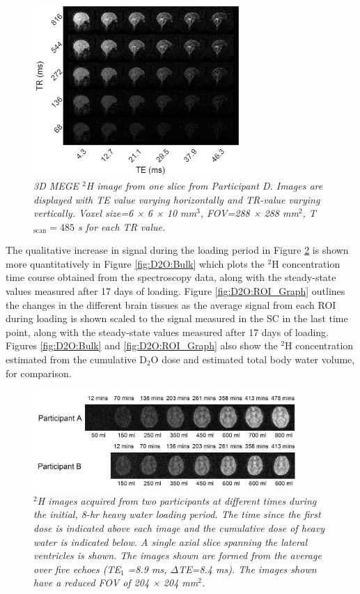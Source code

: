 \begin{figure}[H]
    \centering
    \includegraphics[width = 0.7\textwidth]{Figures/D2O/TR_TE.png}
    \caption{\textit{3D MEGE $^2$H image from one slice from Participant D. Images are displayed with TE value varying horizontally and TR-value varying vertically. Voxel size=6 × 6 × 10 mm$^3$, FOV=288 × 288 mm$^2$, T$_\textrm{scan}=485$ s for each TR value.}}
    \label{fig:D2O:TR_TE}
\end{figure}

The qualitative increase in signal during the loading period in Figure \ref{fig:D2O:Load} is shown more quantitatively in Figure \ref{fig:D2O:Bulk} which plots the $^2$H concentration time course obtained from the spectroscopy data, along with the steady-state values measured after 17 days of loading. Figure \ref{fig:D2O:ROI_Graph} outlines the changes in the different brain tissues as the average signal from each \ac{ROI} during loading is shown scaled to the signal measured in the \ac{SC} in the last time point, along with the steady-state values measured after 17 days of loading. Figures \ref{fig:D2O:Bulk} and \ref{fig:D2O:ROI_Graph} also show the $^2$H concentration estimated from the cumulative D$_2$O dose and estimated total body water volume, for comparison. 

\begin{figure}[H]
    \centering
    \includegraphics[width=0.9\textwidth]{Figures/D2O/Loading.png}
    \caption{\textit{$^2$H images acquired from two participants at different times during the initial, 8-hr heavy water loading period. The time since the first dose is indicated above each image and the cumulative dose of heavy water is indicated below. A single axial slice spanning the lateral ventricles is shown. The images shown are formed from the average over five echoes (TE$_1$ =8.9 ms, $\Delta$TE=8.4 ms). The images shown have a reduced FOV of 204 × 204 mm$^2$.}}
    \label{fig:D2O:Load}
\end{figure}

